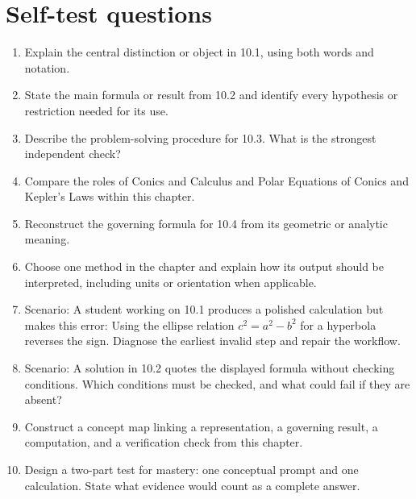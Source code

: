 \documentclass[11pt]{article}
\begin{document}
\section{Self-test questions}
\begin{enumerate}
\item Explain the central distinction or object in 10.1, using both words and notation.
\item State the main formula or result from 10.2 and identify every hypothesis or restriction needed for its use.
\item Describe the problem-solving procedure for 10.3. What is the strongest independent check?
\item Compare the roles of Conics and Calculus and Polar Equations of Conics and Kepler's Laws within this chapter.
\item Reconstruct the governing formula for 10.4 from its geometric or analytic meaning.
\item Choose one method in the chapter and explain how its output should be interpreted, including units or orientation when applicable.
\item Scenario: A student working on 10.1 produces a polished calculation but makes this error: Using the ellipse relation $c^2=a^2-b^2$ for a hyperbola reverses the sign. Diagnose the earliest invalid step and repair the workflow.
\item Scenario: A solution in 10.2 quotes the displayed formula without checking conditions. Which conditions must be checked, and what could fail if they are absent?
\item Construct a concept map linking a representation, a governing result, a computation, and a verification check from this chapter.
\item Design a two-part test for mastery: one conceptual prompt and one calculation. State what evidence would count as a complete answer.
\end{enumerate}

\end{document}
